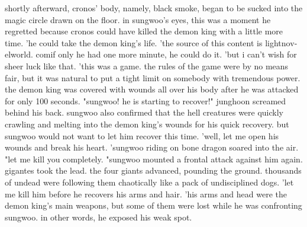 shortly afterward, cronos' body, namely, black smoke, began to be sucked into the magic circle drawn on the floor.
 in sungwoo's eyes, this was a moment he regretted because cronos could have killed the demon king with a little more time.
 'he could take the demon king's life.
'the source of this content is lightnov­elworld.
c­omif only he had one more minute, he could do it.
 'but i can't wish for sheer luck like that.
'this was a game.
 the rules of the game were by no means fair, but it was natural to put a tight limit on somebody with tremendous power.
the demon king was covered with wounds all over his body after he was attacked for only 100 seconds.
 "sungwoo! he is starting to recover!" junghoon screamed behind his back.
sungwoo also confirmed that the hell creatures were quickly crawling and melting into the demon king's wounds for his quick recovery.
 but sungwoo would not want to let him recover this time.
 'well, let me open his wounds and break his heart.
'sungwoo riding on bone dragon soared into the air.
"let me kill you completely.
"sungwoo mounted a frontal attack against him again.
gigantes took the lead.
 the four giants advanced, pounding the ground.
 thousands of undead were following them chaotically like a pack of undisciplined dogs.
'let me kill him before he recovers his arms and hair.
'his arms and head were the demon king's main weapons, but some of them were lost while he was confronting sungwoo.
 in other words, he exposed his weak spot.
 
